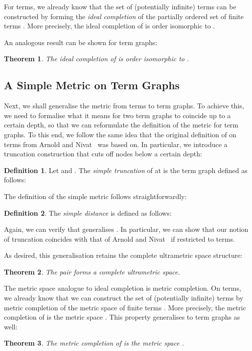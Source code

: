 \documentclass[copyright,creativecommons,UKenglish,final]{eptcs}
\theoremstyle{definition}
\newtheorem{definition}{Definition}[section]
\theoremstyle{plain}
\newtheorem{theorem}{Theorem}[section]
\begin{document}
For terms, we already know that the set of (potentially infinite)
terms can be constructed by forming the \emph{ideal completion} of the
partially ordered set  of finite terms
\cite{berry77popl}. More precisely, the ideal completion of
 is order isomorphic to .

An analogous result can be shown for term graphs:
\begin{theorem}\label{thr:idealCompletion}
  The ideal completion of  is order isomorphic
  to .
\end{theorem}


\subsection{A Simple Metric on Term Graphs}
\label{sec:simple-metric-term}

Next, we shall generalise the metric  from terms to term
graphs. To achieve this, we need to formalise what it means for two
term graphs to coincide up to a certain depth, so that we can
reformulate the definition of the metric  for term graphs. To
this end, we follow the same idea that the original definition of
 on terms from Arnold and Nivat~\cite{arnold80fi} was based
on. In particular, we introduce a truncation construction that cuts
off nodes below a certain depth:
\begin{definition}\label{def:trunca}
  Let  and . The \emph{simple
    truncation}  of  at  is the term graph
  defined as follows:
  
\end{definition}

The definition of the simple metric  follows straightforwardly:
\begin{definition}The \emph{simple distance}  is defined as follows:
  
\end{definition}

Again, we can verify that  generalises . In particular, we
can show that our notion of truncation coincides with that of Arnold
and Nivat~\cite{arnold80fi} if restricted to terms.

As desired, this generalisation retains the complete ultrametric space
structure:
\begin{theorem}
  \label{thr:smetricComplete}The pair  forms a complete ultrametric space.
\end{theorem}

The metric space analogue to ideal completion is metric completion. On
terms, we already know that we can construct the set of (potentially
infinite) terms  by metric completion of the metric space
 of finite terms \cite{barr93tcs}. More precisely, the
metric completion of  is the metric space
. This property generalises to term graphs as well:
\begin{theorem}\label{thr:metricCompletion}
  The metric completion of  is the metric space
  .
\end{theorem}
\end{document}
